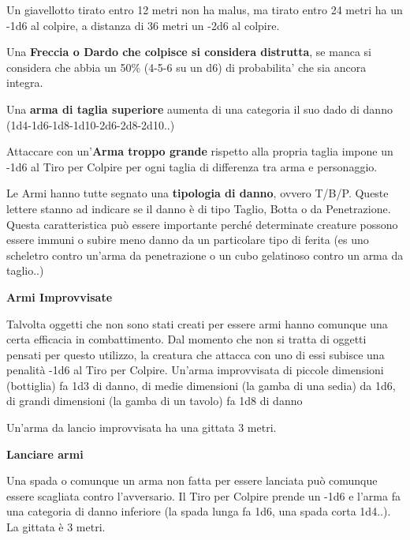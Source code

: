 \documentclass[a4paper,11pt,twoside,openany]{book}
\begin{document}
Un giavellotto tirato entro 12 metri non ha malus, ma tirato entro 24 metri ha un -1d6 al colpire, a distanza di 36 metri un -2d6 al colpire.

\medskip


Una \textbf{Freccia o Dardo che colpisce si considera distrutta}, se manca si considera che abbia un 50\% (4-5-6 su un d6) di probabilita' che sia ancora integra.

\medskip

Una \textbf{arma di taglia superiore} aumenta di una categoria il suo dado di danno (1d4-1d6-1d8-1d10-2d6-2d8-2d10..)

\medskip

Attaccare con un'\textbf{Arma troppo grande} rispetto alla propria taglia impone un -1d6 al Tiro per Colpire per ogni taglia di differenza tra arma e personaggio.

\medskip

Le Armi hanno tutte segnato una \textbf{tipologia di danno}, ovvero T/B/P. 	Queste lettere stanno ad indicare se il danno è di tipo Taglio, Botta 	o da Penetrazione. Questa caratteristica può essere importante perché 	determinate creature possono essere immuni o subire meno danno da un particolare tipo di ferita (es uno scheletro contro un'arma da penetrazione o un cubo gelatinoso contro un arma da taglio..)

\medskip

\textbf{Armi Improvvisate}

Talvolta oggetti che non sono stati creati per essere armi hanno comunque una certa efficacia in combattimento. Dal momento che non si tratta di oggetti pensati per questo utilizzo, la creatura che attacca con uno di essi subisce una penalità -1d6 al Tiro per Colpire. Un'arma improvvisata di piccole dimensioni (bottiglia) fa 1d3 di danno, di medie dimensioni (la gamba di una sedia) da 1d6, di grandi dimensioni (la gamba di un tavolo) fa 1d8 di danno

Un'arma da lancio improvvisata ha una gittata 3 metri.

\medskip

\textbf{Lanciare armi}

Una spada o comunque un arma non fatta per essere lanciata può comunque essere scagliata contro l'avversario. Il Tiro per Colpire prende un -1d6 e l'arma fa una categoria di danno inferiore (la spada lunga fa 1d6, una spada corta 1d4..). La gittata è 3 metri.
\end{document}
